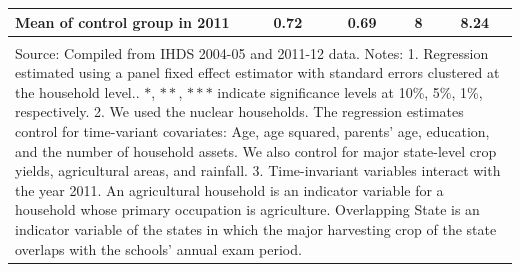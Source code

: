\documentclass[12pt,letterpaper]{article}
\newcommand{\0}{\ensuremath{\mbox{\boldmath $0$}}}
\begin{document}
\begin{table}[h!]
\begin{center}
{{\begin{tabular}{lcccc}
Mean of control group in 2011          &       0.72 &       0.69 &          8 &       8.24 \\
\hline\\
\multicolumn{5}{p{20cm}}{{\footnotesize Source: Compiled from IHDS 2004-05 and 2011-12 data.
Notes: 1. Regression estimated using a panel fixed effect estimator with standard errors clustered at the household level.. $*$, $**$, $***$ indicate significance levels at 10\%, 5\%, 1\%, respectively.
2. We used the nuclear households. The regression estimates control for time-variant covariates: Age, age squared, parents' age, education, and the number of household assets. We also control for major state-level crop yields, agricultural areas, and rainfall. 
3. Time-invariant variables interact with the year 2011. An agricultural household is an indicator variable for a household whose primary occupation is agriculture. Overlapping State is an indicator variable of the states in which the major harvesting crop of the state overlaps with the schools' annual exam period. }}
\end{tabular}}}
\end{center}
\end{table}
\end{document}
